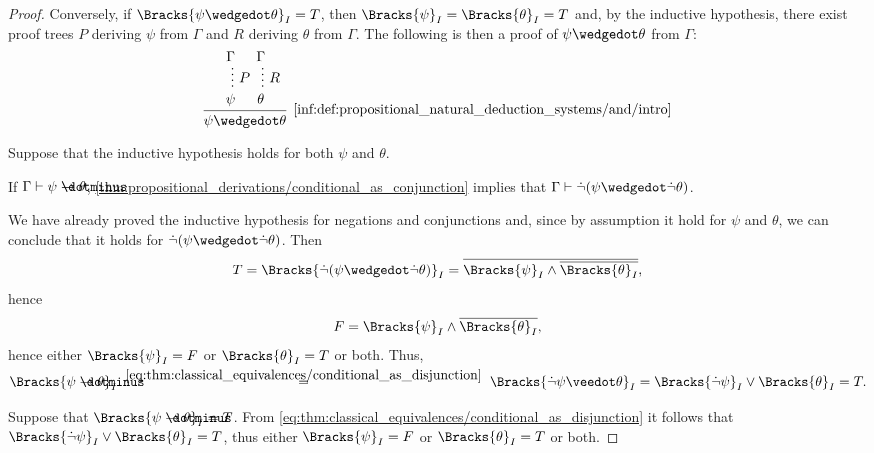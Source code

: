 \begin{proof}
  \NecessitySubProof* Conversely, if \( \Bracks{\psi \synwedge \theta}_I = T \), then \( \Bracks{\psi}_I = \Bracks{\theta}_I = T \) and, by the inductive hypothesis, there exist proof trees \( P \) deriving \( \psi \) from \( \Gamma \) and \( R \) deriving \( \theta \) from \( \Gamma \). The following is then a proof of \( \psi \synwedge \theta \) from \( \Gamma \):
  \begin{equation*}
    \begin{prooftree}
      \hypo{ \Gamma }
      \ellipsis {\( P \)} { \psi }

      \hypo{ \Gamma }
      \ellipsis {\( R \)} { \theta }

      \infer2[\ref{inf:def:propositional_natural_deduction_systems/and/intro}]{ \psi \synwedge \theta }
    \end{prooftree}
  \end{equation*}

   Suppose that the inductive hypothesis holds for both \( \psi \) and \( \theta \).

  \SufficiencySubProof* If \( \Gamma \vdash \psi \synimplies \theta \), \eqref{thm:propositional_derivations/conditional_as_conjunction} implies that \( \Gamma \vdash \synneg(\psi \synwedge \synneg \theta) \).

  We have already proved the inductive hypothesis for negations and conjunctions and, since by assumption it hold for \( \psi \) and \( \theta \), we can conclude that it holds for \( \synneg(\psi \synwedge \synneg \theta) \). Then
  \begin{equation*}
    T
    =
    \Bracks{\synneg(\psi \synwedge \synneg \theta)}_I
    =
    \oline{\Bracks{\psi}_I \wedge \oline{\Bracks{\theta}_I}},
  \end{equation*}
  hence
  \begin{equation*}
    F = \Bracks{\psi}_I \wedge \oline{\Bracks{\theta}_I},
  \end{equation*}
  hence either \( \Bracks{\psi}_I = F \) or \( \Bracks{\theta}_I = T \) or both. Thus,
  \begin{equation*}
    \Bracks{\psi \synimplies \theta}_I
    \reloset {\eqref{eq:thm:classical_equivalences/conditional_as_disjunction}} =
    \Bracks{\synneg \psi \synvee \theta}_I
    =
    \Bracks{\synneg \psi}_I \vee \Bracks{\theta}_I
    =
    T.
  \end{equation*}

  \NecessitySubProof* Suppose that \( \Bracks{\psi \synimplies \theta}_I = T \). From \eqref{eq:thm:classical_equivalences/conditional_as_disjunction} it follows that \( \Bracks{\synneg \psi}_I \vee \Bracks{\theta}_I = T \), thus either \( \Bracks{\psi}_I = F \) or \( \Bracks{\theta}_I = T \) or both.


\end{proof}
